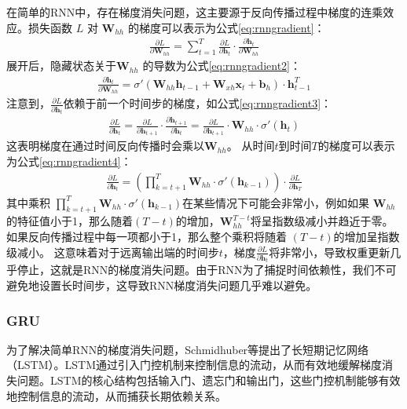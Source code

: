 在简单的RNN中，存在梯度消失问题，这主要源于反向传播过程中梯度的连乘效应\cite{schmidhuber1997long}。损失函数 $L$ 对 $\mathbf{W}_{hh}$ 的梯度可以表示为公式\eqref{eq:rnngradient}：
\begin{align}
  \frac{\partial L}{\partial \mathbf{W}_{hh}} = \sum_{t=1}^{T} \frac{\partial L}{\partial \mathbf{h}_t} \cdot \frac{\partial \mathbf{h}_t}{\partial \mathbf{W}_{hh}} \label{eq:rnngradient}
\end{align}
展开后，隐藏状态关于$\mathbf{W}_{hh}$ 的导数为公式\eqref{eq:rnngradient2}：
\begin{align}
  \frac{\partial \mathbf{h}_t}{\partial \mathbf{W}_{hh}} = \sigma'(\mathbf{W}_{hh} \mathbf{h}_{t-1} + \mathbf{W}_{xh} \mathbf{x}_t + \mathbf{b}_h) \cdot \mathbf{h}_{t-1}^T \label{eq:rnngradient2}
\end{align}
注意到，$\frac{\partial L}{\partial \mathbf{h}_t}$依赖于前一个时间步的梯度，如公式\eqref{eq:rnngradient3}：
\begin{align}
  \frac{\partial L}{\partial \mathbf{h}_t} = \frac{\partial L}{\partial \mathbf{h}_{t+1}} \cdot \frac{\partial \mathbf{h}_{t+1}}{\partial \mathbf{h}_t} = \frac{\partial L}{\partial \mathbf{h}_{t+1}} \cdot \mathbf{W}_{hh} \cdot \sigma'(\mathbf{h}_t) \label{eq:rnngradient3}
\end{align}
这表明梯度在通过时间反向传播时会乘以$\mathbf{W}_{hh}$。
从时间$t$到时间$T$的梯度可以表示为公式\eqref{eq:rnngradient4}：
\begin{align}
  \frac{\partial L}{\partial \mathbf{h}_t} = \left( \prod_{k=t+1}^{T} \mathbf{W}_{hh} \cdot \sigma'(\mathbf{h}_{k-1}) \right) \cdot \frac{\partial L}{\partial \mathbf{h}_T} \label{eq:rnngradient4}
\end{align}
其中乘积 $\prod_{k=t+1}^{T} \mathbf{W}_{hh} \cdot \sigma'(\mathbf{h}_{k-1})$在某些情况下可能会非常小，例如如果 $\mathbf{W}_{hh}$的特征值小于1，那么随着$(T - t)$的增加，$\mathbf{W}_{hh}^{T-t}$将呈指数级减小并趋近于零。
如果反向传播过程中每一项都小于1，那么整个乘积将随着 $(T - t)$的增加呈指数级减小。
这意味着对于远离输出端的时间步$t$，梯度$\frac{\partial L}{\partial \mathbf{h}_t}$将非常小，导致权重更新几乎停止，这就是RNN的梯度消失问题。由于RNN为了捕捉时间依赖性，我们不可避免地设置长时间步，这导致RNN梯度消失问题几乎难以避免。
\subsubsection{GRU}
为了解决简单RNN的梯度消失问题，Schmidhuber等提出了长短期记忆网络（LSTM）\cite{schmidhuber1997long}。LSTM通过引入门控机制来控制信息的流动，从而有效地缓解梯度消失问题。LSTM的核心结构包括输入门、遗忘门和输出门，这些门控机制能够有效地控制信息的流动，从而捕获长期依赖关系。

